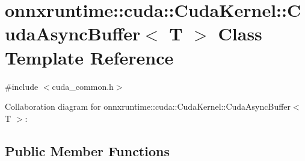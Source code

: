 \hypertarget{classonnxruntime_1_1cuda_1_1CudaKernel_1_1CudaAsyncBuffer}{}\section{onnxruntime\+:\+:cuda\+:\+:Cuda\+Kernel\+:\+:Cuda\+Async\+Buffer$<$ T $>$ Class Template Reference}
\label{classonnxruntime_1_1cuda_1_1CudaKernel_1_1CudaAsyncBuffer}


{\ttfamily \#include $<$cuda\+\_\+common.\+h$>$}



Collaboration diagram for onnxruntime\+:\+:cuda\+:\+:Cuda\+Kernel\+:\+:Cuda\+Async\+Buffer$<$ T $>$\+:
\subsection*{Public Member Functions}
